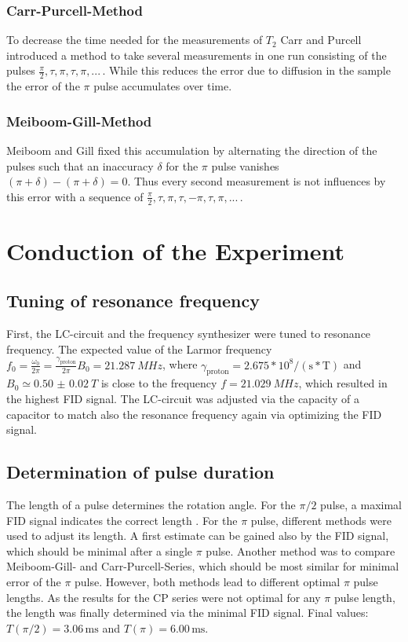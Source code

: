 \documentclass[a4paper]{scrartcl}
\numberwithin{equation}{section}
\numberwithin{figure}{section}
\numberwithin{table}{section}
\begin{document}
\subsubsection*{Carr-Purcell-Method}
To decrease the time needed for the measurements of $T_2$ Carr and Purcell \cite{purcell} introduced a method to take several measurements in one run consisting of the pulses $\frac{\pi}{2},\tau,\pi,\tau,\pi,...\,$. While this reduces the error due to diffusion in the sample the error of the $\pi$ pulse accumulates over time.

\subsubsection*{Meiboom-Gill-Method}
Meiboom and Gill fixed this accumulation by alternating the direction of the pulses such that an inaccuracy $\delta$ for the $\pi$ pulse vanishes $(\pi+\delta)-(\pi+\delta)=0$. Thus every second measurement is not influences by this error with a sequence of $\frac{\pi}{2},\tau,\pi,\tau,-\pi,\tau,\pi,...\,$.

\clearpage
\section{Conduction of the Experiment}
\subsection{Tuning of resonance frequency}
First, the LC-circuit and the frequency synthesizer were tuned to resonance frequency. The expected value of the Larmor frequency $f_0=\frac{\omega_0}{2\pi}=\frac{\gamma_\text{proton}}{2\pi} B_0 =  \SI{21.287}{MHz}$, where $\gamma_\text{proton}=2.675*10^8/(\text{s}*\text{T})$ and $B_0\simeq\SI{0.50(2)}{T}$ \cite{hersteller} is close to the frequency $f=\SI{21.029}{MHz}$, which resulted in the highest FID signal. The LC-circuit was adjusted via the capacity of a capacitor to match also the resonance frequency again via optimizing the FID signal.
\subsection{Determination of pulse duration}
The length of a pulse determines the rotation angle. For the $\pi/2$ pulse, a maximal FID signal indicates the correct length . For the $\pi$ pulse, different methods were used to adjust its length. A first estimate can be gained also by the FID signal, which should be minimal after a single $\pi$ pulse. Another method was to compare Meiboom-Gill- and Carr-Purcell-Series, which should be most similar for minimal error of the $\pi$ pulse. However, both methods lead to different optimal $\pi$ pulse lengths. As the results for the CP series were not optimal for any $\pi$ pulse length, the length was finally determined via the minimal FID signal. Final values: $T\left(\pi/2\right) = 3.06\,\text{ms}$ and $T\left(\pi\right) = 6.00\,\text{ms}$. 
\end{document}
